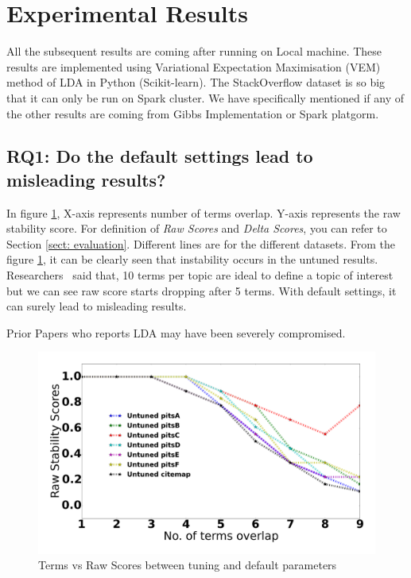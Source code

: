 \documentclass[conference]{IEEEtran}
\theoremstyle{break}
\begin{document}
\section{Experimental Results}

All the subsequent results are coming after running on Local machine. These results are implemented using Variational Expectation Maximisation (VEM) method of LDA in Python (Scikit-learn). The StackOverflow dataset is so big that it can only be run on Spark cluster. We have specifically mentioned if any of the other results are coming from Gibbs Implementation or Spark platgorm.

\subsection{\textbf{RQ1: Do the default settings lead to misleading results?}}

In figure \ref{fig:raw_untuned}, X-axis represents number of terms overlap. Y-axis represents the raw stability score. For definition of \textit{Raw Scores} and \textit{Delta Scores}, you can refer to Section \ref{sect: evaluation}. Different lines are for the different datasets. From the figure \ref{fig:raw_untuned}, it can be clearly seen that instability occurs in the untuned results. Researchers~\cite{panichella2013effectively, lukins2010bug} said that, 10 terms per topic are ideal to define a topic of interest but we can see raw score starts dropping after 5 terms. With default settings, it can surely lead to misleading results.

\begin{lesson}
Prior Papers who reports LDA may have been severely compromised.
\end{lesson}

\begin{center}
\begin{figure}[!htb]
  \includegraphics[width=\linewidth]{./fig/Vem_untuned.png}
  \caption{Terms vs Raw Scores between tuning and default parameters}
  \label{fig:raw_untuned}
\end{figure}
\end{center}
\end{document}
